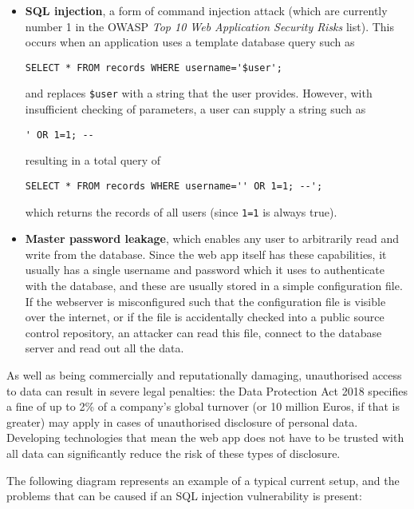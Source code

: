\documentclass{article}
\begin{document}
\begin{itemize}
\item
  \textbf{SQL injection}, a form of command injection attack (which are currently number 1 in the OWASP \textit{Top 10 Web Application Security Risks} list\cite{OWASP10}). This occurs when an application uses a template database query such as
\begin{verbatim}
SELECT * FROM records WHERE username='$user';
\end{verbatim}
and replaces \verb+$user+ with a string that the user provides. However, with insufficient checking of parameters, a user can supply a string such as
\begin{verbatim}
' OR 1=1; --
\end{verbatim}
resulting in a total query of
\begin{verbatim}
SELECT * FROM records WHERE username='' OR 1=1; --';
\end{verbatim}
which returns the records of all users (since \verb+1=1+ is always true).

\item
  \textbf{Master password leakage}, which enables any user to arbitrarily read and write from the database. Since the web app itself has these capabilities, it usually has a single username and password which it uses to authenticate with the database, and these are usually stored in a simple configuration file. If the webserver is misconfigured such that the configuration file is visible over the internet, or if the file is accidentally checked into a public source control repository, an attacker can read this file, connect to the database server and read out all the data.

\end{itemize}

As well as being commercially and reputationally damaging, unauthorised access to data can result in severe legal penalties: the Data Protection Act 2018 specifies a fine of up to 2\% of a company's global turnover (or 10 million Euros, if that is greater) may apply in cases of unauthorised disclosure of personal data\cite{GDPR}. Developing technologies that mean the web app does not have to be trusted with all data can significantly reduce the risk of these types of disclosure.

The following diagram represents an example of a typical current setup, and the problems that can be caused if an SQL injection vulnerability is present:
\end{document}
